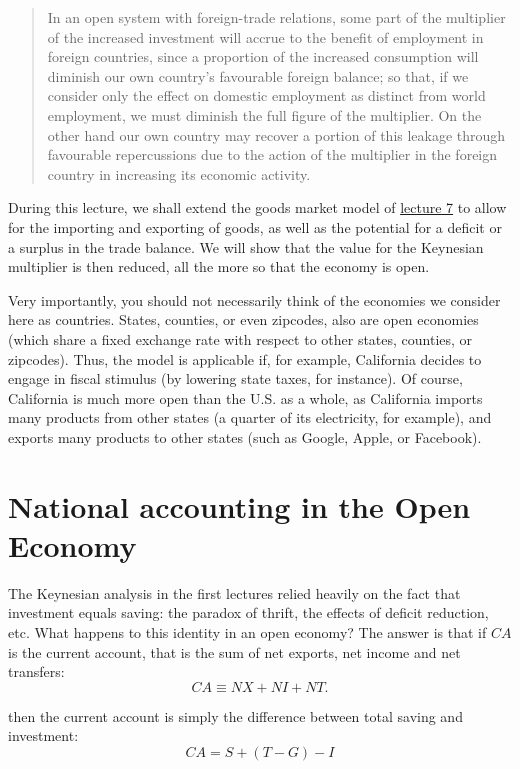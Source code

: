 \documentclass[]{book}
\theoremstyle{definition}
\theoremstyle{definition}
\theoremstyle{definition}
\theoremstyle{remark}
\begin{document}
\begin{quote}
In an open system with foreign-trade relations, some part of the
multiplier of the increased investment will accrue to the benefit of
employment in foreign countries, since a proportion of the increased
consumption will diminish our own country's favourable foreign balance;
so that, if we consider only the effect on domestic employment as
distinct from world employment, we must diminish the full figure of the
multiplier. On the other hand our own country may recover a portion of
this leakage through favourable repercussions due to the action of the
multiplier in the foreign country in increasing its economic activity.
\end{quote}

During this lecture, we shall extend the goods market model of
\protect\hyperlink{cons-function}{lecture 7} to allow for the importing
and exporting of goods, as well as the potential for a deficit or a
surplus in the trade balance. We will show that the value for the
Keynesian multiplier is then reduced, all the more so that the economy
is open.

Very importantly, you should not necessarily think of the economies we
consider here as countries. States, counties, or even zipcodes, also are
open economies (which share a fixed exchange rate with respect to other
states, counties, or zipcodes). Thus, the model is applicable if, for
example, California decides to engage in fiscal stimulus (by lowering
state taxes, for instance). Of course, California is much more open than
the U.S. as a whole, as California imports many products from other
states (a quarter of its electricity, for example), and exports many
products to other states (such as Google, Apple, or Facebook).

\section{National accounting in the Open
Economy}\label{national-accounting-in-the-open-economy}

The Keynesian analysis in the first lectures relied heavily on the fact
that investment equals saving: the paradox of thrift, the effects of
deficit reduction, etc. What happens to this identity in an open
economy? The answer is that if \(CA\) is the current account, that is
the sum of net exports, net income and net transfers:
\[CA\equiv NX+NI+NT.\]

then the current account is simply the difference between total saving
and investment: \[CA=S+\left(T-G\right)-I\]
\end{document}
